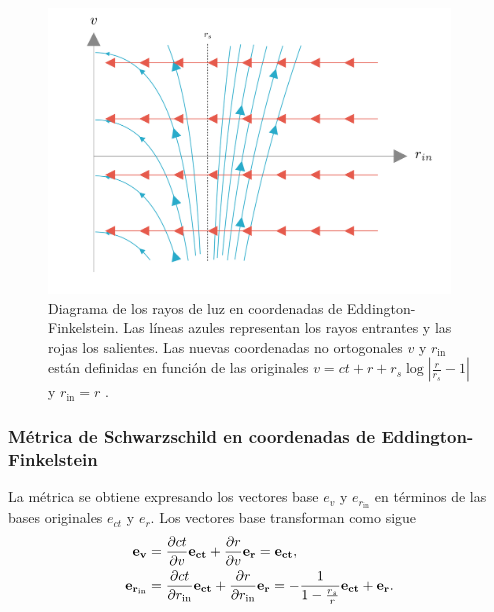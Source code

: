 \begin{figure}[H]
    \begin{small}
        \begin{center}
            \includegraphics[width=0.95\textwidth]{AgujerosNegros/Schwarzschild/media/images/EddingtonFinkelsteinVR_ManimCE_v0.19.0.png}
        \end{center}
        \caption{Diagrama de los rayos de luz en coordenadas de Eddington-Finkelstein. Las líneas azules representan los rayos entrantes y las rojas los salientes. Las nuevas coordenadas no ortogonales \(v\) y \(r_{\text{in}}\) están definidas en función de las originales \(v = ct + r + r_s \log \left| \frac{r}{r_s} - 1 \right|\) y \(r_{\text{in}} = r\) .}
    \end{small}
\end{figure}

\subsubsection{Métrica de Schwarzschild en coordenadas de Eddington-Finkelstein}
La métrica se obtiene expresando los vectores base \( e_v \) y \( e_{r_{\text{in}}} \) en términos de las bases originales \( e_{ct} \) y \( e_r \).
Los vectores base transforman como sigue
\begin{equation}
    \begin{aligned}
        \mathbf{e_v}                & = \frac{\partial ct}{\partial v} \mathbf{e_{ct}} + \frac{\partial r}{\partial v} \mathbf{e_r} = \mathbf{e_{ct}},                                                                \\
        \mathbf{e_{r_{\text{in}}} } & = \frac{\partial ct}{\partial r_{\text{in}}} \mathbf{e_{ct}} + \frac{\partial r}{\partial r_{\text{in}}} \mathbf{e_r} = -\frac{1}{1 - \frac{r_s}{r}} \mathbf{e_{ct}} + \mathbf{e_r}.
    \end{aligned}
\end{equation}

